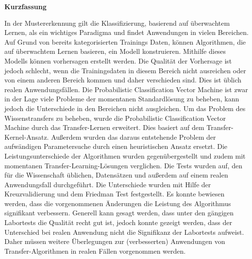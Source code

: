 \begin{center}
 	\Large\textbf{Kurzfassung}\\
\end{center}
In der Mustererkennung gilt die Klassifizierung, basierend auf überwachtem Lernen, als ein wichtiges Paradigma und findet Anwendungen in vielen Bereichen. Auf Grund von bereits kategorisierten Trainings Daten, können Algorithmen, die auf überwachtem Lernen basieren, ein Modell konstruieren. Mithilfe dieses Modells können vorhersagen erstellt werden. Die Qualität der Vorhersage ist jedoch schlecht, wenn die Trainingsdaten in diesem Bereich nicht ausreichen oder von einem anderen Bereich kommen und daher verschieden sind. Dies ist üblich realen Anwendungsfällen. Die Probabilistic Classification Vector Machine ist zwar in der Lage viele Probleme der momentanen Standardlösung zu beheben, kann jedoch die Unterschiede in den Bereichen nicht ausgleichen. Um das Problem des Wissenstransfers zu beheben, wurde die Probabilistic Classification Vector Machine durch das Transfer-Lernen erweitert. Dies basiert auf dem Transfer-Kernel-Ansatz. Außerdem wurden das daraus entstehende Problem der aufwändigen Parametersuche durch einen heuristischen Ansatz ersetzt. Die Leistungsunterschiede der Algorithmen wurden gegenübergestellt und zudem mit momentanen Transfer-Learning-Lösungen verglichen. Die Tests wurden auf, den für die Wissenschaft üblichen, Datensätzen und außerdem auf einem realen Anwendungsfall durchgeführt. Die Unterschiede wurden mit Hilfe der Kreuzvalidierung und dem Friedman Test festgestellt. Es konnte bewiesen werden, dass die vorgenommenen Änderungen die Leistung des Algorithmus signifikant verbessern. Generell kann gesagt werden, dass unter den gängigen Labortests die Qualität recht gut ist, jedoch konnte gezeigt werden, dass der Unterschied bei realen Anwendung nicht die Signifikanz der Labortests aufweist. Daher müssen weitere Überlegungen zur (verbesserten) Anwendungen von Transfer-Algorithmen in realen Fällen vorgenommen werden.
\newpage

